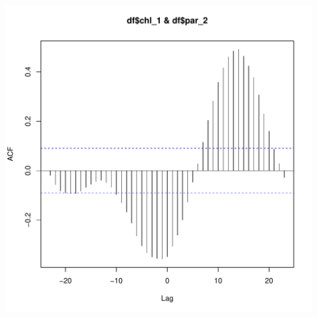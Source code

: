 \documentclass{article}\usepackage[]{graphicx}\usepackage[]{color}
\makeatletter
\def\maxwidth{ %
  \ifdim\Gin@nat@width>\linewidth
    \linewidth
  \else
    \Gin@nat@width
  \fi
}
\newenvironment{knitrout}{}{} %
\makeatother
\begin{document}
\begin{knitrout}
\includegraphics[width=\maxwidth]{figure/unnamed-chunk-16-2} 

\end{knitrout}
\end{document}
